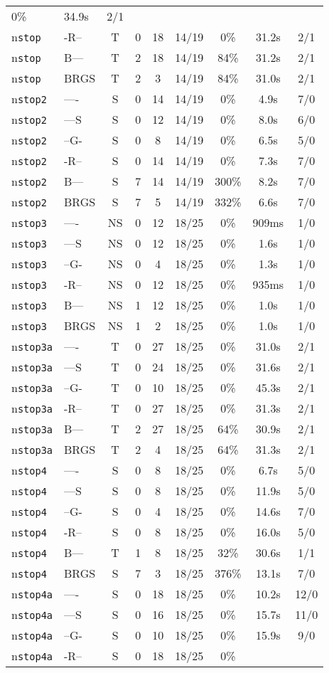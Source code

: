 \begin{tabular}{llccccccc}
0\% & 34.9s & 2/1 \\n\texttt{stop} & -R-- & T & 0 & 18 & 14/19 & 0\% & 31.2s & 2/1 \\n\texttt{stop} & B--- & T & 2 & 18 & 14/19 & 84\% & 31.2s & 2/1 \\n\texttt{stop} & BRGS & T & 2 & 3 & 14/19 & 84\% & 31.0s & 2/1 \\n\texttt{stop2} & ---- & S & 0 & 14 & 14/19 & 0\% & 4.9s & 7/0 \\n\texttt{stop2} & ---S & S & 0 & 12 & 14/19 & 0\% & 8.0s & 6/0 \\n\texttt{stop2} & --G- & S & 0 & 8 & 14/19 & 0\% & 6.5s & 5/0 \\n\texttt{stop2} & -R-- & S & 0 & 14 & 14/19 & 0\% & 7.3s & 7/0 \\n\texttt{stop2} & B--- & S & 7 & 14 & 14/19 & 300\% & 8.2s & 7/0 \\n\texttt{stop2} & BRGS & S & 7 & 5 & 14/19 & 332\% & 6.6s & 7/0 \\n\texttt{stop3} & ---- & NS & 0 & 12 & 18/25 & 0\% & 909ms & 1/0 \\n\texttt{stop3} & ---S & NS & 0 & 12 & 18/25 & 0\% & 1.6s & 1/0 \\n\texttt{stop3} & --G- & NS & 0 & 4 & 18/25 & 0\% & 1.3s & 1/0 \\n\texttt{stop3} & -R-- & NS & 0 & 12 & 18/25 & 0\% & 935ms & 1/0 \\n\texttt{stop3} & B--- & NS & 1 & 12 & 18/25 & 0\% & 1.0s & 1/0 \\n\texttt{stop3} & BRGS & NS & 1 & 2 & 18/25 & 0\% & 1.0s & 1/0 \\n\texttt{stop3a} & ---- & T & 0 & 27 & 18/25 & 0\% & 31.0s & 2/1 \\n\texttt{stop3a} & ---S & T & 0 & 24 & 18/25 & 0\% & 31.6s & 2/1 \\n\texttt{stop3a} & --G- & T & 0 & 10 & 18/25 & 0\% & 45.3s & 2/1 \\n\texttt{stop3a} & -R-- & T & 0 & 27 & 18/25 & 0\% & 31.3s & 2/1 \\n\texttt{stop3a} & B--- & T & 2 & 27 & 18/25 & 64\% & 30.9s & 2/1 \\n\texttt{stop3a} & BRGS & T & 2 & 4 & 18/25 & 64\% & 31.3s & 2/1 \\n\texttt{stop4} & ---- & S & 0 & 8 & 18/25 & 0\% & 6.7s & 5/0 \\n\texttt{stop4} & ---S & S & 0 & 8 & 18/25 & 0\% & 11.9s & 5/0 \\n\texttt{stop4} & --G- & S & 0 & 4 & 18/25 & 0\% & 14.6s & 7/0 \\n\texttt{stop4} & -R-- & S & 0 & 8 & 18/25 & 0\% & 16.0s & 5/0 \\n\texttt{stop4} & B--- & T & 1 & 8 & 18/25 & 32\% & 30.6s & 1/1 \\n\texttt{stop4} & BRGS & S & 7 & 3 & 18/25 & 376\% & 13.1s & 7/0 \\n\texttt{stop4a} & ---- & S & 0 & 18 & 18/25 & 0\% & 10.2s & 12/0 \\n\texttt{stop4a} & ---S & S & 0 & 16 & 18/25 & 0\% & 15.7s & 11/0 \\n\texttt{stop4a} & --G- & S & 0 & 10 & 18/25 & 0\% & 15.9s & 9/0 \\n\texttt{stop4a} & -R-- & S & 0 & 18 & 18/25 & 0\% & 
\end{tabular}
